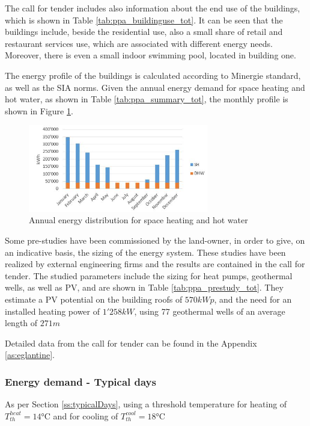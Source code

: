 \documentclass{article}
\begin{document}
The call for tender includes also information about the end use of the buildings, which is shown in Table \ref{tab:ppa_buildinguse_tot}. It can be seen that the buildings include, beside the residential use, also a small share of retail and restaurant services use, which are associated with different energy needs. Moreover, there is even a small indoor swimming pool, located in building one. 



The energy profile of the buildings is calculated according to Minergie standard, as well as the SIA norms. Given the annual energy demand for space heating and hot water, as shown in Table \ref{tab:ppa_summary_tot}, the monthly profile is shown in Figure \ref{fig:ppa_energydemand}.

\begin{figure}[htp]
\centering
\includegraphics[width=0.7\textwidth]{ppa_energydemand.JPG}
\caption{Annual energy distribution for space heating and hot water}
\label{fig:ppa_energydemand}
\end{figure}

Some pre-studies have been commissioned by the land-owner, in order to give, on an indicative basis, the sizing of the energy system. These studies have been realized by external engineering firms and the results are contained in the call for tender. The studied parameters include the sizing for heat pumps, geothermal wells, as well as PV, and are shown in Table \ref{tab:ppa_prestudy_tot}. They estimate a PV potential on the building roofs of $570 kWp$, and the need for an installed heating power of $1'258 kW$, using 77 geothermal wells of an average length of $271 m$



Detailed data from the call for tender can be found in the Appendix \ref{as:eglantine}.

\subsubsection{Energy demand - Typical days}
As per Section \ref{ss:typicalDays},
using a threshold temperature for heating of $T_{th}^{heat} = 14\si{\celsius}$ and for cooling of $T_{th}^{cool} = 18 \si{\celsius}$
\end{document}
